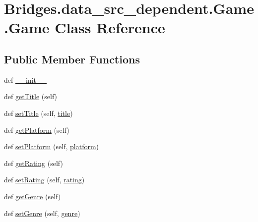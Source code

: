 \hypertarget{class_bridges_1_1data__src__dependent_1_1_game_1_1_game}{}\section{Bridges.\+data\+\_\+src\+\_\+dependent.\+Game.\+Game Class Reference}
\label{class_bridges_1_1data__src__dependent_1_1_game_1_1_game}
\subsection*{Public Member Functions}
\begin{DoxyCompactItemize}
\item 
def \hyperlink{class_bridges_1_1data__src__dependent_1_1_game_1_1_game_ae8c53df2dcf498beaa4996f3ef9cecb3}{\+\_\+\+\_\+init\+\_\+\+\_\+}
\item 
def \hyperlink{class_bridges_1_1data__src__dependent_1_1_game_1_1_game_aee33e242e349fe51354993ef18e48601}{get\+Title} (self)
\item 
def \hyperlink{class_bridges_1_1data__src__dependent_1_1_game_1_1_game_a0e19af6b38196c081b27640ca41e02ba}{set\+Title} (self, \hyperlink{class_bridges_1_1data__src__dependent_1_1_game_1_1_game_acdee6e5e3cfde65afd0cf5a781af369c}{title})
\item 
def \hyperlink{class_bridges_1_1data__src__dependent_1_1_game_1_1_game_ab93b639e971e2809b8afa5669af17eba}{get\+Platform} (self)
\item 
def \hyperlink{class_bridges_1_1data__src__dependent_1_1_game_1_1_game_a20037de90989a3b217ab118c2d19970c}{set\+Platform} (self, \hyperlink{class_bridges_1_1data__src__dependent_1_1_game_1_1_game_a0ad1b3e406c0b665d5023a031fb84452}{platform})
\item 
def \hyperlink{class_bridges_1_1data__src__dependent_1_1_game_1_1_game_a823ccfcbaf1a55e0a7c8963c8a74b453}{get\+Rating} (self)
\item 
def \hyperlink{class_bridges_1_1data__src__dependent_1_1_game_1_1_game_af7b7589d27239f6d005c4c7f80cd6924}{set\+Rating} (self, \hyperlink{class_bridges_1_1data__src__dependent_1_1_game_1_1_game_a7b6f882e8bf2b6453f25bcb16e0023f8}{rating})
\item 
def \hyperlink{class_bridges_1_1data__src__dependent_1_1_game_1_1_game_ad11f1e24895ab2f018bd69132d0d099e}{get\+Genre} (self)
\item 
def \hyperlink{class_bridges_1_1data__src__dependent_1_1_game_1_1_game_aff0c552becce808e5d310fccb8caacbe}{set\+Genre} (self, \hyperlink{class_bridges_1_1data__src__dependent_1_1_game_1_1_game_a0b59a498c49fec8cd05495413dbe1ce1}{genre})
\end{DoxyCompactItemize}
